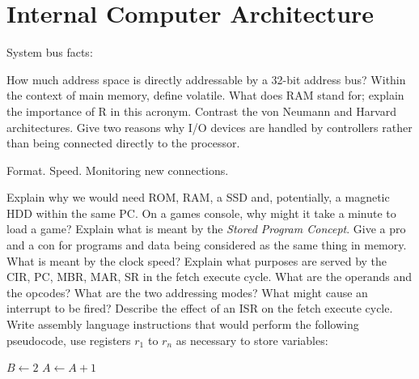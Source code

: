 \section{Internal Computer Architecture}

\begin{questions}
	\question System bus facts: 
	\question How much address space is directly addressable by a 32-bit address bus? 
	\question Within the context of main memory, define volatile. 
	\question What does RAM stand for; explain the importance of R in this acronym. 
	\question Contrast the von Neumann and Harvard architectures.
	\question Give two reasons why I/O devices are handled by controllers rather than being connected directly to the processor. \begin{solution}Format. Speed. Monitoring new connections. \end{solution}  
	\question Explain why we would need ROM, RAM, a SSD and, potentially, a magnetic HDD within the same PC.
	\question On a games console, why might it take a minute to load a game?   
	\question Explain what is meant by the \emph{Stored Program Concept}. 
	\question Give a pro and a con for programs and data being considered as the same thing in memory. 
	\question What is meant by the clock speed? 
	\question Explain what purposes are served by the CIR, PC, MBR, MAR, SR in the fetch execute cycle. 
	\question What are the operands and the opcodes? 
	\question What are the two addressing modes? 
	\question What might cause an interrupt to be fired? 
	\question Describe the effect of an ISR on the fetch execute cycle. 
	\question Write assembly language instructions that would perform the following pseudocode, use registers $r_1$ to $r_n$ as necessary to store variables:
	\begin{algorithmic}
		\State $B \gets 2$ 
	\Else 
		\State $A \gets A + 1$ 
	\EndIf
	\end{algorithmic}
\end{questions}